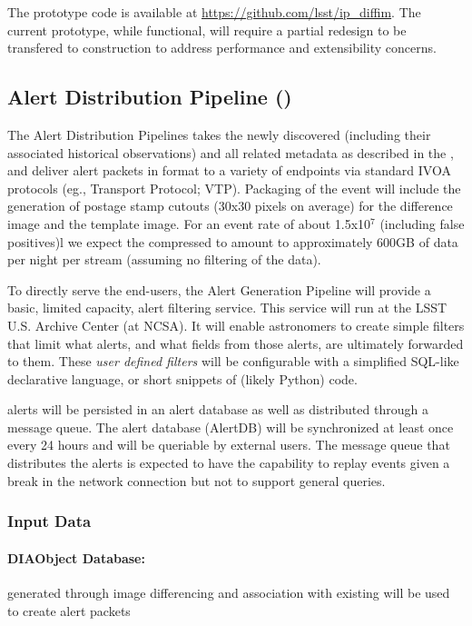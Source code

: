 The prototype code is available at \url{https://github.com/lsst/ip_diffim}. The current prototype, while functional, will require a partial redesign to be transfered to construction to address performance and extensibility concerns.

\clearpage

\subsection{Alert Distribution Pipeline (\wbsAP)}

The Alert Distribution Pipelines takes the newly discovered \DIAObjects (including their associated historical observations) and all related metadata as described in the \DPDD, and deliver alert packets in \VOEvent format to a variety of endpoints via standard IVOA protocols (eg., \VOEvent Transport Protocol; VTP\@). Packaging of the event will include the generation of postage stamp cutouts (30x30 pixels on average) for the difference image and the template image. For an event rate of about 1.5x10$^7$ (including false positives)l we expect the compressed \VOEvents to amount to approximately 600GB of data per night per \VOEvent stream (assuming no filtering of the data). 

To directly serve the end-users, the Alert Generation Pipeline will provide a basic, limited capacity, alert filtering service. This service will run at the LSST U.S. Archive Center (at NCSA). It will enable astronomers to create simple filters that limit what alerts, and what fields from those alerts, are ultimately forwarded to them. These \emph{user defined filters} will be configurable with a simplified SQL-like declarative language, or short snippets of (likely Python) code.

\VOEvent alerts will be persisted in an alert database as well as distributed through a message queue. The alert database (AlertDB) will be synchronized at least once every 24 hours and will be queriable by external users. The message queue that distributes the alerts is expected to have the capability  to replay events given a break in the network connection but not to support general queries.

\subsubsection{Input Data}
\label{sec:apADInput}

\paragraph*{DIAObject Database:} \DIAObjects generated through image differencing and association with existing \DIAObjects will be used to create alert packets 


